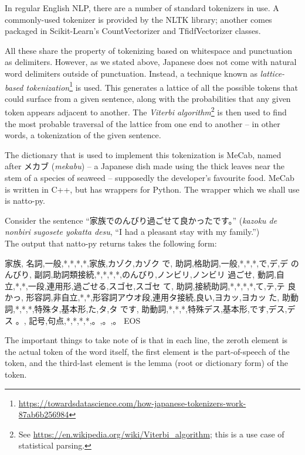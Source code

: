 \documentclass[12pt]{article}
\begin{document}
	In regular English NLP, there are a number of standard tokenizers in use. A commonly-used tokenizer is provided by the NLTK library; another comes packaged in Scikit-Learn's CountVectorizer and TfidfVectorizer classes.
	
	All these share the property of tokenizing based on whitespace and punctuation as delimiters. However, as we stated above, Japanese does not come with natural word delimiters outside of punctuation. Instead, a technique known as \emph{lattice-based tokenization}\footnote{\url{https://towardsdatascience.com/how-japanese-tokenizers-work-87ab6b256984}} is used. This generates a lattice of all the possible tokens that could surface from a given sentence, along with the probabilities that any given token appears adjacent to another. The \emph{Viterbi algorithm}\footnote{See \url{https://en.wikipedia.org/wiki/Viterbi_algorithm}; this is a use case of statistical parsing.} is then used to find the most probable traversal of the lattice from one end to another -- in other words, a tokenization of the given sentence.
	
	The dictionary that is used to implement this tokenization is MeCab, named after メカブ (\textit{mekabu}) -- a Japanese dish made using the thick leaves near the stem of a species of seaweed -- supposedly the developer's favourite food. MeCab is written in C++, but has wrappers for Python. The wrapper which we shall use is natto-py.
	
	Consider the sentence ``家族でのんびり過ごせて良かったです。'' (\textit{kazoku de nonbiri sugosete yokatta desu}, ``I had a pleasant stay with my family.'')\\
	The output that natto-py returns takes the following form: \begin{verbatim*}
		家族,	名詞,一般,*,*,*,*,家族,カゾク,カゾク
		で,	助詞,格助詞,一般,*,*,*,で,デ,デ
		のんびり,	副詞,助詞類接続,*,*,*,*,のんびり,ノンビリ,ノンビリ
		過ごせ,	動詞,自立,*,*,一段,連用形,過ごせる,スゴセ,スゴセ
		て,	助詞,接続助詞,*,*,*,*,て,テ,テ
		良かっ,	形容詞,非自立,*,*,形容詞アウオ段,連用タ接続,良い,ヨカッ,ヨカッ
		た,	助動詞,*,*,*,特殊タ,基本形,た,タ,タ
		です,	助動詞,*,*,*,特殊デス,基本形,です,デス,デス
		。,	記号,句点,*,*,*,*,。,。,。
		EOS
	\end{verbatim*} 
	
	The important things to take note of is that in each line, the zeroth element is the actual token of the word itself, the first element is the part-of-speech of the token, and the third-last element is the lemma (root or dictionary form) of the token.
	
\end{document}
